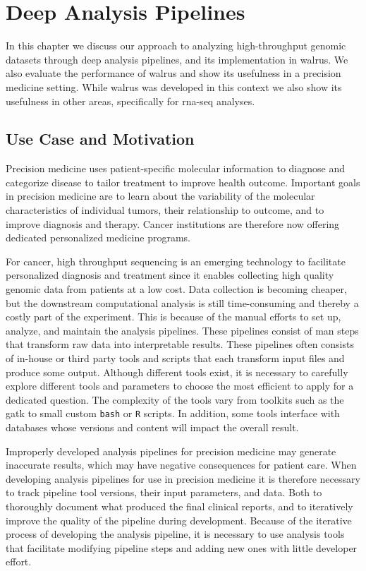 \chapter{Deep Analysis Pipelines}\label{pipeline}  
In this chapter we discuss our approach to analyzing high-throughput genomic
datasets through deep analysis pipelines, and its implementation in 
walrus.\cite{walrus} We also evaluate the performance of walrus and show its
usefulness in a precision medicine setting. While walrus was developed in this
context we also show its usefulness in other areas, specifically for
\gls{rna}-seq analyses. 

\section{Use Case and Motivation} 
Precision medicine uses patient-specific molecular information to diagnose and
categorize disease to tailor treatment to improve health
outcome.\cite{national2011toward} Important goals in precision medicine are to
learn about the variability of the molecular characteristics of individual
tumors, their relationship to outcome, and to improve diagnosis and
therapy.\cite{tannock2016limits} Cancer institutions are therefore now
offering dedicated personalized medicine programs. 

For cancer, high throughput sequencing is an emerging technology to facilitate
personalized diagnosis and treatment since it enables collecting high quality
genomic data from patients at a low cost. Data collection is becoming cheaper,
but the downstream computational analysis is still time-consuming and thereby a
costly part of the experiment.  This is because of the manual efforts to set up,
analyze, and maintain the analysis pipelines. These pipelines consist of man 
steps that transform raw data into interpretable
results.\cite{diao2015building} These pipelines often consists of in-house or
third party tools and scripts that each transform input files and produce some
output. Although different tools exist, it is necessary to carefully explore
different tools and parameters to choose the most efficient to apply for a
dedicated question.\cite{servant2014bioinformatics} The complexity of the tools
vary from toolkits such as the \gls{gatk} to small custom \texttt{bash} or
\texttt{R} scripts.  In addition, some tools interface with databases whose
versions and content will impact the overall result.\cite{sboner2015primer}

Improperly developed analysis pipelines for precision medicine may generate
inaccurate results, which may have negative consequences for patient
care.\cite{roy2017standards} 
When developing analysis pipelines for use in precision medicine it is therefore
necessary to track pipeline tool versions, their input parameters, and data.
Both to thoroughly document what produced the final clinical reports, and
to iteratively improve the quality of the pipeline during development.
Because of the iterative process of developing the analysis pipeline, it is
necessary to use analysis tools that facilitate modifying pipeline steps and
adding new ones with little developer effort.

